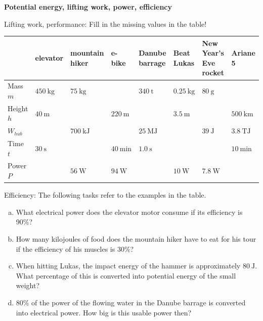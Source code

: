 \documentclass[a4paper]{article}
\begin{document}
	{\bf Potential energy, lifting work, power, efficiency}
	
	\begin{enumerate}[1.]
		{\bf \item Lifting work, performance: Fill in the missing values in the table!}
		
		\renewcommand{\arraystretch}{2}
		\begin{tabular}{|p{1.7 cm}|p{1.7 cm}|p{1.7 cm}|p{1.7 cm}|p{1.7 cm}|p{1.7 cm}|p{1.7 cm}|p{1.7 cm}|}
			\hline
			& elevator & mountain hiker & e-bike & Danube barrage & Beat Lukas & New Year's Eve rocket & Ariane 5 \\
			\hline
			Mass $m$ &$\SI{450}{\kilogram}$ &$\SI{75}{\kilogram}$ & &$\SI{340}{\tonne}$ &$\SI{0.25} {\kilogram}$ &$\SI{80}{\gram}$ & \\
			\hline
			Height $h$ &$\SI{40}{\meter}$ & &$\SI{220}{\meter}$ & &$\SI{3.5}{\meter}$ & &$\SI{ 500}{\kilo\meter}$ \\
			\hline
			$W_{hub}$ & &$\SI{700}{\kilo\joule}$ & &$\SI{25}{\mega\joule}$ & &$\SI{39}{\joule}$ & $\SI{3.8}{\tera\joule}$ \\
			\hline
			Time $t$ &$\SI{30}{\second}$ & &$\SI{40}{\minute}$ &$\SI{1,0}{\second}$ & & &$\SI{ 10}{\minute}$ \\
			\hline
			Power $P$ & &$\SI{56}{\watt}$ &$\SI{94}{\watt}$ & &$\SI{10}{\watt}$ &$\SI{7.8 }{\watt}$ & \\
			\hline
		\end{tabular}
		
		{\bf \item Efficiency: The following tasks refer to the examples in the table. }
		
		\begin{enumerate}[a)]
			\item What electrical power does the elevator motor consume if its efficiency is 90\%?
			\item How many kilojoules of food does the mountain hiker have to eat for his tour if the efficiency of his muscles is 30\%?
			\item When hitting Lukas, the impact energy of the hammer is approximately $\SI{80}{\joule}$. What percentage of this is converted into potential energy of the small weight?
			\item 80\% of the power of the flowing water in the Danube barrage is converted into electrical power. How big is this usable power then?
			
		\end{enumerate}
		
		
	\end{enumerate}
	
\end{document}
